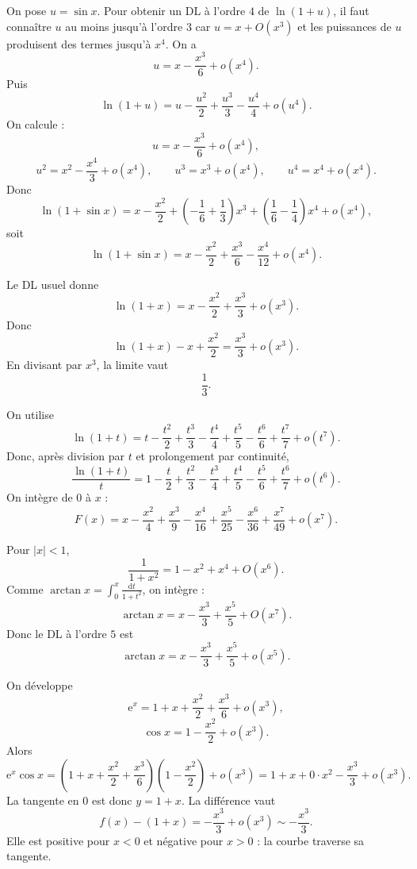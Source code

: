 \documentclass[11pt,a4paper]{article}
\newenvironment{corrige}[1][]{\begin{tcolorbox}[colframe=vertprepa!70!black,colback=green!2!white,title={Correction \ifx\relax#1\relax\else{} — #1\fi}]}{\end{tcolorbox}}
\newcommand{\e}{\mathrm{e}}
\newcommand{\dd}{\mathrm{d}}
\begin{document}
\begin{corrige}[Exercice 4]
On pose $u=\sin x$. Pour obtenir un DL à l'ordre $4$ de $\ln(1+u)$, il faut connaître $u$ au moins jusqu'à l'ordre $3$ car $u=x+O(x^3)$ et les puissances de $u$ produisent des termes jusqu'à $x^4$. On a
\[
  u=x-\frac{x^3}{6}+o(x^4).
\]
Puis
\[
  \ln(1+u)=u-\frac{u^2}{2}+\frac{u^3}{3}-\frac{u^4}{4}+o(u^4).
\]
On calcule :
\[
  u=x-\frac{x^3}{6}+o(x^4),
\]
\[
  u^2=x^2-\frac{x^4}{3}+o(x^4),
  \qquad
  u^3=x^3+o(x^4),
  \qquad
  u^4=x^4+o(x^4).
\]
Donc
\[
\ln(1+\sin x)
=x-\frac{x^2}{2}+\left(-\frac16+\frac13\right)x^3+
\left(\frac16-\frac14\right)x^4+o(x^4),
\]
soit
\[
  \boxed{\ln(1+\sin x)=x-\frac{x^2}{2}+\frac{x^3}{6}-\frac{x^4}{12}+o(x^4).}
\]
\end{corrige}

\begin{corrige}[Exercice 5]
Le DL usuel donne
\[
  \ln(1+x)=x-\frac{x^2}{2}+\frac{x^3}{3}+o(x^3).
\]
Donc
\[
  \ln(1+x)-x+\frac{x^2}{2}=\frac{x^3}{3}+o(x^3).
\]
En divisant par $x^3$, la limite vaut
\[
  \boxed{\frac13}.
\]
\end{corrige}

\begin{corrige}[Exercice 6]
On utilise
\[
  \ln(1+t)=t-\frac{t^2}{2}+\frac{t^3}{3}-\frac{t^4}{4}+\frac{t^5}{5}-\frac{t^6}{6}+\frac{t^7}{7}+o(t^7).
\]
Donc, après division par $t$ et prolongement par continuité,
\[
  \frac{\ln(1+t)}{t}=1-\frac t2+\frac{t^2}{3}-\frac{t^3}{4}+\frac{t^4}{5}-\frac{t^5}{6}+\frac{t^6}{7}+o(t^6).
\]
On intègre de $0$ à $x$ :
\[
  F(x)=x-\frac{x^2}{4}+\frac{x^3}{9}-\frac{x^4}{16}+\frac{x^5}{25}-\frac{x^6}{36}+\frac{x^7}{49}+o(x^7).
\]
\end{corrige}

\begin{corrige}[Exercice 7]
Pour $|x|<1$,
\[
  \frac1{1+x^2}=1-x^2+x^4+O(x^6).
\]
Comme $\arctan x=\int_0^x \frac{\dd t}{1+t^2}$, on intègre :
\[
  \arctan x=x-\frac{x^3}{3}+\frac{x^5}{5}+O(x^7).
\]
Donc le DL à l'ordre $5$ est
\[
  \boxed{\arctan x=x-\frac{x^3}{3}+\frac{x^5}{5}+o(x^5).}
\]
\end{corrige}

\begin{corrige}[Exercice 8]
On développe
\[
  \e^x=1+x+\frac{x^2}{2}+\frac{x^3}{6}+o(x^3),
\]
\[
  \cos x=1-\frac{x^2}{2}+o(x^3).
\]
Alors
\[
  \e^x\cos x=(1+x+\frac{x^2}{2}+\frac{x^3}{6})(1-\frac{x^2}{2})+o(x^3)
  =1+x+0\cdot x^2-\frac{x^3}{3}+o(x^3).
\]
La tangente en $0$ est donc $y=1+x$. La différence vaut
\[
  f(x)-(1+x)=-\frac{x^3}{3}+o(x^3)\sim-\frac{x^3}{3}.
\]
Elle est positive pour $x<0$ et négative pour $x>0$ : la courbe traverse sa tangente.
\end{corrige}
\end{document}

